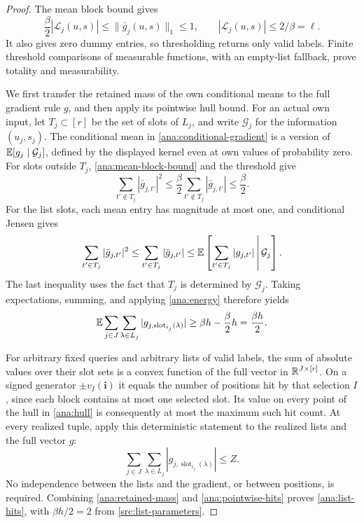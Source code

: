 \begin{proof}
The mean block bound gives
\[
 \frac\beta2|\mathcal L_j(u,s)|\leq\|\bar g_j(u,s)\|_1\leq1,
 \qquad |\mathcal L_j(u,s)|\leq2/\beta=\ell.
\]
It also gives zero dummy entries, so thresholding returns only valid
labels. Finite threshold comparisons of measurable functions, with
an empty-list fallback, prove totality and measurability.

We first transfer the retained mass of the own conditional means
to the full gradient rule \(g\), and then apply its pointwise hull bound.
For an actual own input, let \(T_j\subset[r]\) be the set of slots
of \(L_j\), and write \(\mathcal G_j\) for the information
\((u_j,s_j)\). The conditional mean in
\eqref{ana:conditional-gradient} is a version of
\(\mathbb E[g_j\mid\mathcal G_j]\), defined by the displayed kernel even
at own values of probability zero. For slots outside \(T_j\),
\eqref{ana:mean-block-bound} and the threshold give
\[
 \sum_{t'\notin T_j}|\bar g_{j,t'}|^2
       \leq\frac\beta2\sum_{t'\notin T_j}|\bar g_{j,t'}|
       \leq\frac\beta2.
\]
For the list slots, each mean entry has magnitude at most one, and
conditional Jensen gives
\[
 \sum_{t'\in T_j}|\bar g_{j,t'}|^2
   \leq\sum_{t'\in T_j}|\bar g_{j,t'}|
   \leq\mathbb E\left[\sum_{t'\in T_j}|g_{j,t'}|
                         \,\middle|\,\mathcal G_j\right].
\]
The last inequality uses the fact that \(T_j\) is determined by
\(\mathcal G_j\). Taking expectations, summing, and applying
\eqref{ana:energy} therefore yields
\begin{equation}
 \mathbb E\sum_{j\in J}\sum_{\lambda\in L_j}
        |g_{j,\operatorname{slot}_{i_j}(\lambda)}|
       \geq\beta h-\frac\beta2h=\frac{\beta h}{2}.
 \label{ana:retained-mass}
\end{equation}

For arbitrary fixed queries and arbitrary lists of valid labels,
the sum of absolute values over their slot sets is a convex
function of the full vector in \(\mathbb R^{J\times[r]}\). On a signed
generator \(\pm v_I(\boldsymbol i)\) it equals the number of
positions hit by that selection \(I\), since each block contains
at most one selected slot. Its value on every point of the hull
in \eqref{ana:hull} is consequently at most the maximum such hit
count. At every realized tuple, apply this deterministic statement
to the realized lists and the full vector \(g\):
\begin{equation}
 \sum_{j\in J}\sum_{\lambda\in L_j}
        |g_{j,\operatorname{slot}_{i_j}(\lambda)}|\leq Z.
 \label{ana:pointwise-hits}
\end{equation}
No independence between the lists and the gradient, or between
positions, is required. Combining \eqref{ana:retained-mass} and
\eqref{ana:pointwise-hits} proves \eqref{ana:list-hits}, with
\(\beta h/2=2\) from \eqref{src:list-parameters}.


\end{proof}
